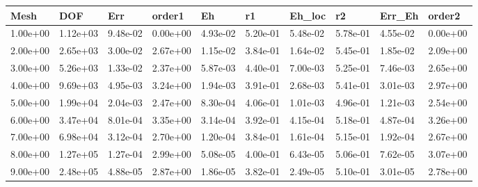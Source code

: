 \begin{tabular}{llllllllll}
Mesh & DOF & Err & order1 & Eh & r1 & Eh_loc & r2 & Err_Eh & order2 \\ 
\hline 
1.00e+00 & 1.12e+03 & 9.48e-02 & 0.00e+00 & 4.93e-02 & 5.20e-01 & 5.48e-02 & 5.78e-01 & 4.55e-02 & 0.00e+00 \\ 
2.00e+00 & 2.65e+03 & 3.00e-02 & 2.67e+00 & 1.15e-02 & 3.84e-01 & 1.64e-02 & 5.45e-01 & 1.85e-02 & 2.09e+00 \\ 
3.00e+00 & 5.26e+03 & 1.33e-02 & 2.37e+00 & 5.87e-03 & 4.40e-01 & 7.00e-03 & 5.25e-01 & 7.46e-03 & 2.65e+00 \\ 
4.00e+00 & 9.69e+03 & 4.95e-03 & 3.24e+00 & 1.94e-03 & 3.91e-01 & 2.68e-03 & 5.41e-01 & 3.01e-03 & 2.97e+00 \\ 
5.00e+00 & 1.99e+04 & 2.04e-03 & 2.47e+00 & 8.30e-04 & 4.06e-01 & 1.01e-03 & 4.96e-01 & 1.21e-03 & 2.54e+00 \\ 
6.00e+00 & 3.47e+04 & 8.01e-04 & 3.35e+00 & 3.14e-04 & 3.92e-01 & 4.15e-04 & 5.18e-01 & 4.87e-04 & 3.26e+00 \\ 
7.00e+00 & 6.98e+04 & 3.12e-04 & 2.70e+00 & 1.20e-04 & 3.84e-01 & 1.61e-04 & 5.15e-01 & 1.92e-04 & 2.67e+00 \\ 
8.00e+00 & 1.27e+05 & 1.27e-04 & 2.99e+00 & 5.08e-05 & 4.00e-01 & 6.43e-05 & 5.06e-01 & 7.62e-05 & 3.07e+00 \\ 
9.00e+00 & 2.48e+05 & 4.88e-05 & 2.87e+00 & 1.86e-05 & 3.82e-01 & 2.49e-05 & 5.10e-01 & 3.01e-05 & 2.78e+00 \\ 
\hline 
\end{tabular}